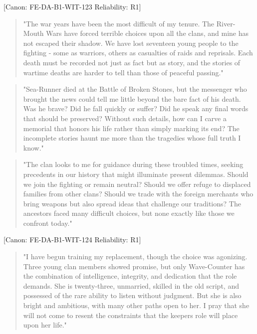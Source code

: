{[}Canon: FE-DA-B1-WIT-123 \textbar{} Reliability: R1{]}

\begin{quote}
"The war years have been the most difficult of my tenure. The
River-Mouth Wars have forced terrible choices upon all the clans, and
mine has not escaped their shadow. We have lost seventeen young people
to the fighting - some as warriors, others as casualties of raids and
reprisals. Each death must be recorded not just as fact but as story,
and the stories of wartime deaths are harder to tell than those of
peaceful passing."
\end{quote}

\begin{quote}
"Sea-Runner died at the Battle of Broken Stones, but the messenger who
brought the news could tell me little beyond the bare fact of his death.
Was he brave? Did he fall quickly or suffer? Did he speak any final
words that should be preserved? Without such details, how can I carve a
memorial that honors his life rather than simply marking its end? The
incomplete stories haunt me more than the tragedies whose full truth I
know."
\end{quote}

\begin{quote}
"The clan looks to me for guidance during these troubled times, seeking
precedents in our history that might illuminate present dilemmas. Should
we join the fighting or remain neutral? Should we offer refuge to
displaced families from other clans? Should we trade with the foreign
merchants who bring weapons but also spread ideas that challenge our
traditions? The ancestors faced many difficult choices, but none exactly
like those we confront today."
\end{quote}

{[}Canon: FE-DA-B1-WIT-124 \textbar{} Reliability: R1{]}

\begin{quote}
"I have begun training my replacement, though the choice was agonizing.
Three young clan members showed promise, but only Wave-Counter has the
combination of intelligence, integrity, and dedication that the role
demands. She is twenty-three, unmarried, skilled in the old script, and
possessed of the rare ability to listen without judgment. But she is
also bright and ambitious, with many other paths open to her. I pray
that she will not come to resent the constraints that the
keeper\textquotesingle s role will place upon her life."
\end{quote}

